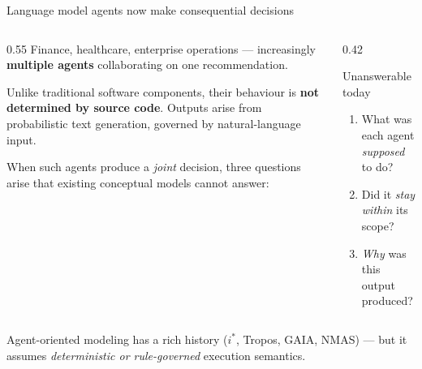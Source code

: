 \documentclass[aspectratio=169,10pt]{beamer}
\newcommand{\key}[1]{\textcolor{aiAccent}{\textbf{#1}}}
\begin{document}
\begin{frame}{Language model agents now make consequential decisions}
  \begin{columns}[T,onlytextwidth]
    \begin{column}{0.55\textwidth}
      Finance, healthcare, enterprise operations --- increasingly
      \key{multiple agents} collaborating on one recommendation.
      \medskip

      Unlike traditional software components, their behaviour is
      \key{not determined by source code}. Outputs arise from
      probabilistic text generation, governed by natural-language input.
      \medskip

      When such agents produce a \emph{joint} decision, three questions
      arise that existing conceptual models cannot answer:
    \end{column}
    \begin{column}{0.42\textwidth}
      \begin{block}{Unanswerable today}
        \begin{enumerate}
          \item What was each agent \emph{supposed} to do?
          \item Did it \emph{stay within} its scope?
          \item \emph{Why} was this output produced?
        \end{enumerate}
      \end{block}
    \end{column}
  \end{columns}
  \vfill
  \begin{center}
    \small\color{aiGray}
    Agent-oriented modeling has a rich history ($i^*$, Tropos, GAIA, NMAS) ---
    but it assumes \emph{deterministic or rule-governed} execution semantics.
  \end{center}
\end{frame}
\end{document}

